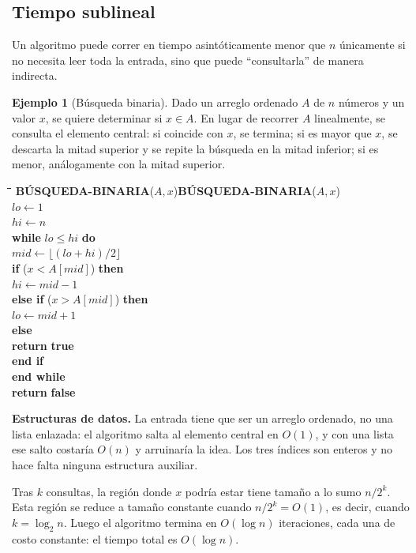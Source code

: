 \documentclass[12pt, spanish, oneside, openany]{book}
\newcommand{\pl}[1]{\makebox[1.6em][r]{\texttt{\footnotesize #1}}\hspace{0.9em}}
\newenvironment{pseudo}[1]{%
  \begin{center}%
  \begin{mdframed}[style=pseudobox]%
  \small
  \begin{tabbing}%
  \hspace{2.5em}\=\hspace{1.5em}\=\hspace{1.5em}\=\hspace{1.5em}\=\hspace{1.5em}\=\kill
  \def\pseudotitulo{#1}\ifx\pseudotitulo\empty\else#1\\[3pt]\fi}%
  {\end{tabbing}\end{mdframed}\end{center}}
\newenvironment{estructuras}%
  {\begin{center}\begin{minipage}{0.93\textwidth}\begin{mdframed}[style=estrbox]%
   \small\textbf{Estructuras de datos.}\;}%
  {\end{mdframed}\end{minipage}\end{center}}
\theoremstyle{uprightplain}
\theoremstyle{definition}
\newtheorem{ejemplo}[teorema]{Ejemplo}
\theoremstyle{remark}
\theoremstyle{definition}
\begin{document}
\subsection{Tiempo sublineal}

Un algoritmo puede correr en tiempo asintóticamente menor que $n$ únicamente si no necesita leer toda la entrada, sino que puede ``consultarla'' de manera indirecta.

\begin{ejemplo}[Búsqueda binaria]
\label{ej:busqueda-binaria}
Dado un arreglo ordenado $A$ de $n$ números y un valor $x$, se quiere determinar si $x\in A$. En lugar de recorrer $A$ linealmente, se consulta el elemento central: si coincide con $x$, se termina; si es mayor que $x$, se descarta la mitad superior y se repite la búsqueda en la mitad inferior; si es menor, análogamente con la mitad superior.
\begin{pseudo}{\textbf{BÚSQUEDA-BINARIA}($A,x$)}
\pl{1}\> $\mathit{lo}\leftarrow 1$\\
\pl{2}\> $\mathit{hi}\leftarrow n$\\
\pl{3}\> \textbf{while} $\mathit{lo}\le \mathit{hi}$ \textbf{do}\\
\pl{4}\>\> $\mathit{mid}\leftarrow \lfloor(\mathit{lo}+\mathit{hi})/2\rfloor$\\
\pl{5}\>\> \textbf{if} ($x < A[\mathit{mid}]$) \textbf{then}\\
\pl{6}\>\>\> $\mathit{hi}\leftarrow \mathit{mid}-1$\\
\pl{7}\>\> \textbf{else if} ($x > A[\mathit{mid}]$) \textbf{then}\\
\pl{8}\>\>\> $\mathit{lo}\leftarrow \mathit{mid}+1$\\
\pl{9}\>\> \textbf{else}\\
\pl{10}\>\>\> \textbf{return} \textbf{true}\\
\pl{11}\>\> \textbf{end if}\\
\pl{12}\> \textbf{end while}\\
\pl{13}\> \textbf{return} \textbf{false}
\end{pseudo}

\begin{estructuras}
La entrada tiene que ser un arreglo ordenado, no una lista enlazada: el
algoritmo salta al elemento central en $O(1)$, y con una lista ese salto
costaría $O(n)$ y arruinaría la idea. Los tres índices son enteros y no hace
falta ninguna estructura auxiliar.
\end{estructuras}
Tras $k$ consultas, la región donde $x$ podría estar tiene tamaño a lo sumo $n/2^k$. Esta región se reduce a tamaño constante cuando $n/2^k=O(1)$, es decir, cuando $k=\log_2 n$. Luego el algoritmo termina en $O(\log n)$ iteraciones, cada una de costo constante: el tiempo total es $O(\log n)$.
\end{ejemplo}
\end{document}
